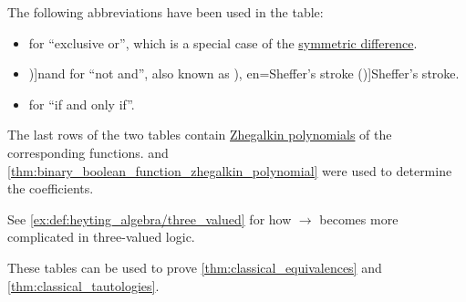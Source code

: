 \begin{definition}
  The following abbreviations have been used in the table:
  \begin{itemize}
    \item {} for \enquote{exclusive or}, which is a special case of the \hyperref[def:symmetric_difference]{symmetric difference}.
    \item \term[en=nand (\cite[40]{Hinman2005Logic})]{nand} for \enquote{not and}, also known as \term[ru=штрих Шеффера (\cite[29]{Эдельман1975Логика}), en=Sheffer's stroke (\cite[40]{Hinman2005Logic})]{Sheffer's stroke}.
    \item {} for \enquote{if and only if}.
  \end{itemize}
\end{definition}
\begin{comments}
  \item The last rows of the two tables contain \hyperref[def:zhegalkin_polynomial]{Zhegalkin polynomials} of the corresponding functions.  and \cref{thm:binary_boolean_function_zhegalkin_polynomial} were used to determine the coefficients.

  \item See \cref{ex:def:heyting_algebra/three_valued} for how \( {\rightarrow} \) becomes more complicated in three-valued logic.

  \item These tables can be used to prove \cref{thm:classical_equivalences} and \cref{thm:classical_tautologies}.
\end{comments}

